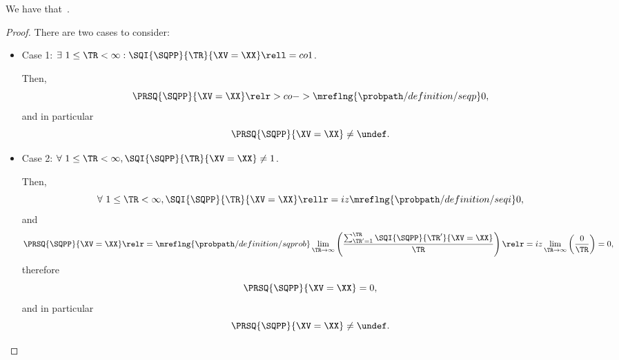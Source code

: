 \begin{proposition}
  We have that\ \sqpproblimdefprop.%
\end{proposition}

\begin{proof}
  There are two cases to consider:
  \begin{itemize}
    \item {} Case 1: $\exists\ 1 \le \TR < \infty : \SQI{\SQPP}{\TR}{\XV = \XX} \rell = co 1$.

      Then,
      $$\PRSQ{\SQPP}{\XV = \XX} \relr > co->\mreflng{\probpath/definition/seqp} 0,$$
      and in particular
      $$\PRSQ{\SQPP}{\XV = \XX} \ne \undef.$$

    \item {} Case 2: $\forall\ 1 \le \TR < \infty, \SQI{\SQPP}{\TR}{\XV= \XX} \ne 1$.

      Then,
      $$\forall\ 1 \le \TR < \infty, \SQI{\SQPP}{\TR}{\XV = \XX} \rellr = iz \mreflng{\probpath/definition/seqi} 0,$$
      and
      $$\PRSQ{\SQPP}{\XV = \XX} 
      \relr = \mreflng{\probpath/definition/sqprob} \lim_{\TR \rightarrow \infty}\left(\frac{\sum_{\TR' = 1}^{\TR}\SQI{\SQPP}{\TR'}{\XV= \XX}}{\TR}\right)
      \relr = iz \lim_{\TR \rightarrow \infty}\left(\frac{0}{\TR}\right) = 0
      ,$$
      therefore
      $$\PRSQ{\SQPP}{\XV = \XX} = 0,$$
      and in particular
      $$\PRSQ{\SQPP}{\XV = \XX} \ne \undef.$$
  \end{itemize}
\end{proof}
